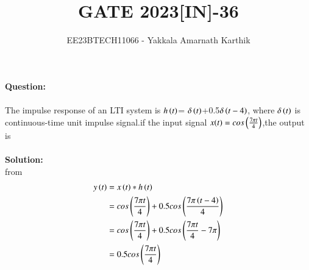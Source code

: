 \documentclass[journal,12pt,twocolumn]{IEEEtran}
\begin{document}


\title{GATE 2023[IN]-36}
\author{EE23BTECH11066 - Yakkala Amarnath Karthik}
\maketitle

\textbf{Question:}\\ \\
The impulse response of an LTI system is $h\left(t\right)$= $\delta\left(t\right)$+0.5$ \delta\left(t-4\right)$, where $\delta\left(t\right)$ is continuous-time unit impulse signal.if the input signal $x(t)=cos\left(\frac{7\pi t}{4}\right)$,the output is\\ \\

\textbf{Solution:}\\




 from 
\begin{align}
    y\left(t\right) &=x\left(t\right) * h\left(t\right)\\
            &=cos\left(\frac{7\pi t}{4}\right)+0.5cos\left(\frac{7\pi \left(t-4\right)}{4}\right)\\
            &=cos\left(\frac{7\pi t}{4}\right)+0.5cos\left(\frac{7\pi t}{4}-7\pi\right)\\
            &=0.5cos\left(\frac{7\pi t}{4}\right)
\end{align}
\end{document}

